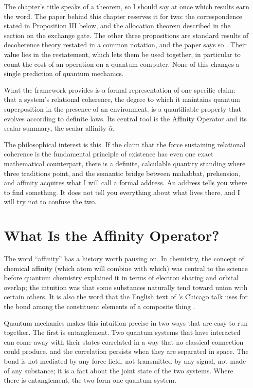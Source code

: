 The chapter's title speaks of a theorem, so I should say at once which results earn the word. The paper behind this chapter reserves it for two: the correspondence stated in Proposition III below, and the allocation theorem described in the section on the exchange gate. The other three propositions are standard results of decoherence theory restated in a common notation, and the paper says so \citep{AdamsRCT}. Their value lies in the restatement, which lets them be used together, in particular to count the cost of an operation on a quantum computer. None of this changes a single prediction of quantum mechanics.

What the framework provides is a formal representation of one specific claim: that a system's relational coherence, the degree to which it maintains quantum superposition in the presence of an environment, is a quantifiable property that evolves according to definite laws. Its central tool is the Affinity Operator and its scalar summary, the scalar affinity $\bar{\alpha}$.

The philosophical interest is this. If the claim that the force sustaining relational coherence is the fundamental principle of existence has even one exact mathematical counterpart, there is a definite, calculable quantity standing where three traditions point, and the semantic bridge between mahabbat, prehension, and affinity acquires what I will call a formal address. An address tells you where to find something. It does not tell you everything about what lives there, and I will try not to confuse the two.


\section{What Is the Affinity Operator?}
\label{sec:ch13-affinity}

The word ``affinity'' has a history worth pausing on. In chemistry, the concept of chemical affinity (which atom will combine with which) was central to the science before quantum chemistry explained it in terms of electron sharing and orbital overlap; the intuition was that some substances naturally tend toward union with certain others. It is also the word that the English text of \AbdulBaha's Chicago talk uses for the bond among the constituent elements of a composite thing \citep[Talk 41]{PUP}.

Quantum mechanics makes this intuition precise in two ways that are easy to run together. The first is entanglement. Two quantum systems that have interacted can come away with their states correlated in a way that no classical connection could produce, and the correlation persists when they are separated in space. The bond is not mediated by any force field, not transmitted by any signal, not made of any substance; it is a fact about the joint state of the two systems. Where there is entanglement, the two form one quantum system.

